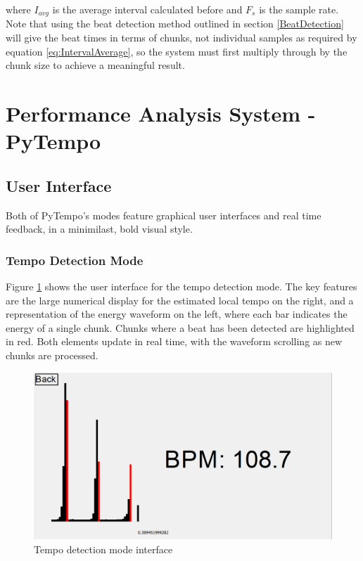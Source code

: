\documentclass[hidelinks,12pt]{article}
\begin{document}
where $I_{avg}$ is the average interval calculated before and $F_s$ is the sample rate. Note that using the beat detection method outlined in section \ref{BeatDetection} will give the beat times in terms of chunks, not individual samples as required by equation \ref{eq:IntervalAverage}, so the system must first multiply through by the chunk size to achieve a meaningful result.
\section{Performance Analysis System - PyTempo} \label{PyTempo}
\subsection{User Interface}
Both of PyTempo's modes feature graphical user interfaces and real time feedback, in a minimilast, bold visual style.
\subsubsection{Tempo Detection Mode}
Figure \ref{fig:TempoDetectScreenshot} shows the user interface for the tempo detection mode. The key features are the large numerical display for the estimated local tempo on the right, and a representation of the energy waveform on the left, where each bar indicates the energy of a single chunk. Chunks where a beat has been detected are highlighted in red. Both elements update in real time, with the waveform scrolling as new chunks are processed.

\begin{figure}[H]
	\begin{center}
		\includegraphics[scale=0.2]{TempoDetectScreenshot.png}
		\caption{Tempo detection mode interface}
		\label{fig:TempoDetectScreenshot}
	\end{center}
\end{figure}
\end{document}
